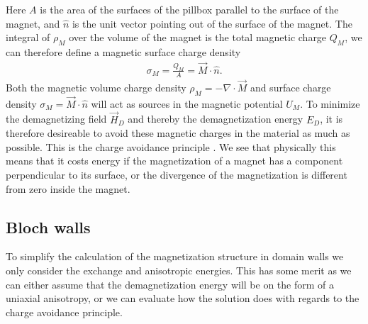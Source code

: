 \documentclass[12pt, a4paper, twoside, openright]{article}		%
\numberwithin{equation}{section}
\begin{document}
Here $A$ is the area of the surfaces of the pillbox parallel to the surface of the magnet, and $\hat{n}$ is the unit vector pointing out of the surface of the magnet. The integral of $\rho_M$ over the volume of the magnet is the total magnetic charge $Q_M$, we can therefore define a magnetic surface charge density
\begin{align}
\label{eq:magsurfacecharge}
\sigma_M = \frac{Q_M}{A} = \vec{M}\cdot\hat{n}.
\end{align}
Both the magnetic volume charge density $\rho_M = -\nabla\cdot\vec{M}$ and surface charge density $\sigma_M = \vec{M}\cdot\hat{n}$ will act as sources in the magnetic potential $U_M$. To minimize the demagnetizing field $\vec{H}_D$ and thereby the demagnetization energy $E_D$, it is therefore desireable to avoid these magnetic charges in the material as much as possible. This is the charge avoidance principle \cite{Coey}. We see that physically this means that it costs energy if the magnetization of a magnet has a component perpendicular to its surface, or the divergence of the magnetization is different from zero inside the magnet.

\subsection{Bloch walls}
To simplify the calculation of the magnetization structure in domain walls we only consider the exchange and anisotropic energies. This has some merit as we can either assume that the demagnetization energy will be on the form of a uniaxial anisotropy, or we can evaluate how the solution does with regards to the charge avoidance principle.
\end{document}
